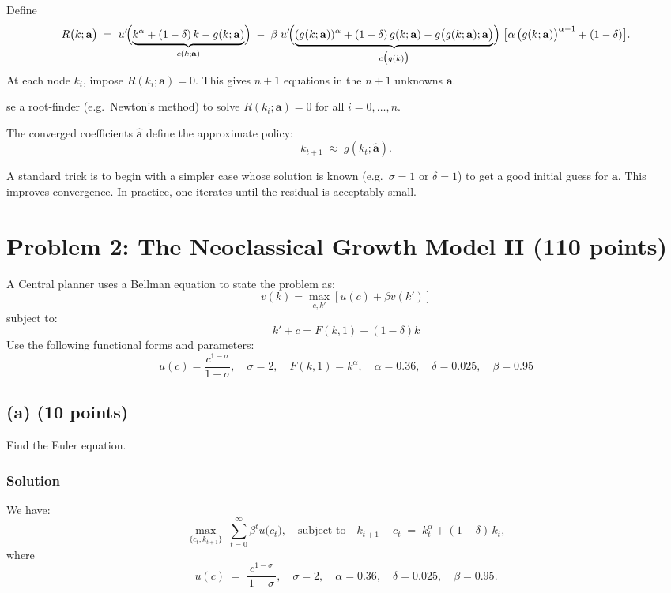 \documentclass[12pt]{article}
\begin{document}
Define 
\[
R\bigl(k;\mathbf{a}\bigr)
\;=\;
u'\!\Bigl(\underbrace{k^\alpha+(1-\delta)\,k - g(k;\mathbf{a})}_{c(k;\mathbf{a})}\Bigr)
\;-\;
\beta\;u'\!\Bigl(\underbrace{(g(k;\mathbf{a}))^\alpha + (1-\delta)\,g(k;\mathbf{a}) - g\bigl(g(k;\mathbf{a});\mathbf{a}\bigr)}_{c\bigl(g(k)\bigr)}\Bigr)
\;\bigl[\alpha\,\bigl(g(k;\mathbf{a})\bigr)^{\alpha-1} + (1-\delta)\bigr].
\]
At each node $k_i$, impose $R(k_i;\mathbf{a})=0$.  This gives $n+1$ equations in the $n+1$ unknowns $\mathbf{a}$.

se a root-finder (e.g.\ Newton's method) to solve $R(k_i;\mathbf{a})=0$ for all $i=0,\dots,n$.

The converged coefficients $\widehat{\mathbf{a}}$ define the approximate policy:
\[
k_{t+1} \;\approx\; g(k_t;\widehat{\mathbf{a}}).
\]

A standard trick is to begin with a simpler case whose solution is known (e.g.\ $\sigma=1$ or $\delta=1$) to get a good initial guess for $\mathbf{a}$.  This improves convergence.  In practice, one iterates until the residual is acceptably small.

\fi




\section*{Problem 2: The Neoclassical Growth Model II (110 points)}
A Central planner uses a Bellman equation to state the problem as:
\[
v(k) = \max_{c,k'} \left[ u(c) + \beta v(k') \right]
\]
subject to:
\[
k' + c = F(k, 1) + (1 - \delta)k
\]
Use the following functional forms and parameters:
\[
u(c) = \frac{c^{1-\sigma}}{1-\sigma}, \quad \sigma = 2, \quad F(k, 1) = k^\alpha, \quad \alpha = 0.36, \quad \delta = 0.025, \quad \beta = 0.95
\]

\subsection*{(a) (10 points)}
Find the Euler equation.

\subsubsection*{Solution}
We have:
\[
\max_{\{c_t,k_{t+1}\}}\;\sum_{t=0}^\infty \beta^t u \bigl(c_t\bigr),
\quad\text{subject to}\quad
k_{t+1} + c_t \;=\;k_t^\alpha + (1-\delta)\,k_t,
\]
where
\[
u(c)
\;=\;
\frac{c^{1-\sigma}}{\,1-\sigma\,},
\quad
\sigma=2,\quad
\alpha=0.36,\quad
\delta=0.025,\quad
\beta=0.95.
\]
\end{document}
